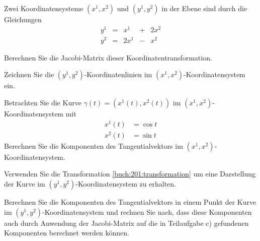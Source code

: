 Zwei Koordinatensysteme $(x^1,x^2)$ und $(y^1,y^2)$ in der Ebene sind
durch die Gleichungen
\begin{equation}
\renewcommand\arraycolsep{2pt}
\begin{array}{rcrcr}
y^1 &=&  x^1 &+& 2x^2 \\
y^2 &=& 2x^1 &-&  x^2
\end{array}
\label{buch:201:transformation}
\end{equation}
\begin{teilaufgaben}
\item
Berechnen Sie die Jacobi-Matrix dieser Koordinatentransformation.
\item
Zeichnen Sie die $(y^1,y^2)$-Koordinatenlinien im
$(x^1,x^2)$-Koordinatensystem ein.
\item
Betrachten Sie die Kurve $\gamma(t) = (x^1(t),x^2(t))$ im
$(x^1,x^2)$-Koordinatensystem mit
\begin{align*}
x^1(t) &= \cos t \\
x^2(t) &= \sin t
\end{align*}
Berechnen Sie die Komponenten des Tangentialvektors im
$(x^1,x^2)$-Koordinaten\-sys\-tem.
\item
Verwenden Sie die Transformation \eqref{buch:201:transformation}
um eine Darstellung der Kurve im $(y^1,y^2)$-Koordinaten\-system
zu erhalten.
\item
Berechnen Sie die Komponenten des Tangentialvektors in einem
Punkt der Kurve im $(y^1,y^2)$-Koordinatensystem und rechnen Sie
nach, dass diese Komponenten auch durch Anwendung der Jacobi-Matrix
auf die in Teilaufgabe c) gefundenen Komponenten berechnet werden
können.
\end{teilaufgaben}

